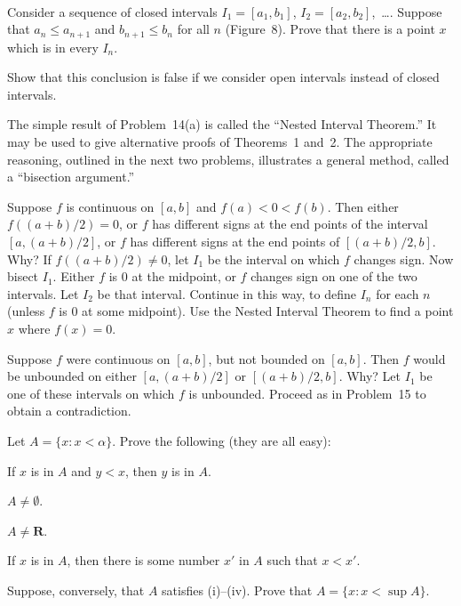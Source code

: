 \begin{center}
\\[0.6em]
\end{center}
\begin{letters}
\item Consider a sequence of closed intervals $I_1 = [a_1,b_1]$,
  $I_2 = [a_2,b_2]$,~\dots. Suppose that $a_n \leq a_{n+1}$ and
  $b_{n+1} \leq b_n$ for all $n$ (Figure~8). Prove that there is a point $x$
  which is in every $I_n$.
\item Show that this conclusion is false if we consider open intervals
  instead of closed intervals.
\end{letters}

The simple result of Problem~14(a) is called the ``Nested Interval Theorem.''
It may be used to give alternative proofs of Theorems~1 and~2. The
appropriate reasoning, outlined in the next two problems, illustrates a
general method, called a ``bisection argument.''

 Suppose $f$ is continuous on $[a,b]$ and $f(a) < 0 < f(b)$. Then
either $f((a+b)/2) = 0$, or $f$ has different signs at the end points of the
interval $[a,(a+b)/2]$, or $f$ has different signs at the end points of
$[(a+b)/2,b]$. Why? If $f((a+b)/2) \neq 0$, let $I_1$ be the interval on
which $f$ changes sign. Now bisect $I_1$. Either $f$ is $0$ at the midpoint,
or $f$ changes sign on one of the two intervals. Let $I_2$ be that interval.
Continue in this way, to define $I_n$ for each $n$ (unless $f$ is $0$ at some
midpoint). Use the Nested Interval Theorem to find a point $x$ where
$f(x) = 0$.

 Suppose $f$ were continuous on $[a,b]$, but not bounded on
$[a,b]$. Then $f$ would be unbounded on either $[a,(a+b)/2]$ or
$[(a+b)/2,b]$. Why? Let $I_1$ be one of these intervals on which $f$ is
unbounded. Proceed as in Problem~15 to obtain a contradiction.

\begin{letters}
\item Let $A = \{x : x < \alpha\}$. Prove the following (they are all easy):
\begin{romans}
\item If $x$ is in $A$ and $y < x$, then $y$ is in $A$.
\item $A \neq \emptyset$.
\item $A \neq \mathbf{R}$.
\item If $x$ is in $A$, then there is some number $x'$ in $A$ such that
  $x < x'$.
\end{romans}
\item Suppose, conversely, that $A$ satisfies (i)--(iv). Prove that
  $A = \{x : x < \sup A\}$.
\end{letters}

